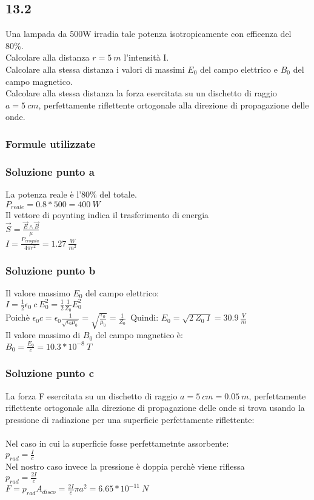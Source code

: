 \documentclass[../../main.tex]{subfiles}
\begin{document}
\subsection*{13.2}
Una lampada da 500W irradia tale potenza isotropicamente con efficenza del 80\%.\\
Calcolare alla distanza $r=5\ m$ l'intensità I.\\
Calcolare alla stessa distanza i valori di massimi $E_0$ del campo elettrico e $B_0$ del campo magnetico.\\
Calcolare alla stessa distanza la forza esercitata su un dischetto di raggio $a=5\ cm$, perfettamente riflettente ortogonale alla direzione di propagazione delle onde.
\subsubsection*{Formule utilizzate}
\subsubsection*{Soluzione punto a}
La potenza reale è l'80\% del totale.\\
$P_{reale} = 0.8 * 500 = 400\ W$\\
Il vettore di poynting indica il trasferimento di energia\\
$\vec{S} = \frac{\vec{E}\wedge\vec{B}}{\mu}$\\
$I = \frac{P_{erogata}}{4\pi r^2} = 1.27\ \frac{W}{m^2}$\\
\subsubsection*{Soluzione punto b}
Il valore massimo $E_0$ del campo elettrico:\\
$I = \frac{1}{2}\epsilon_0\ c\ E_0^2 = \frac{1}{2}\frac{1}{Z_0}E_0^2$\\
Poichè $\epsilon_0 c = \epsilon_0\frac{1}{\sqrt{\epsilon_0\mu_0}} = \sqrt{\frac{\epsilon_0}{\mu_0}} = \frac{1}{Z_0}$\
Quindi: $E_0 = \sqrt{2\ Z_0\ I} = 30.9\ \frac{V}{m}$\\
Il valore massimo di $B_0$ del campo magnetico è:\\
$B_0 = \frac{E_0}{c} = 10.3 * 10^{-8}\ T$
\subsubsection*{Soluzione punto c}
La forza F esercitata su un dischetto di raggio $a = 5\ cm = 0.05\ m$, perfettamente riflettente ortogonale alla direzione di propagazione delle onde si trova usando la pressione di radiazione per una superficie perfettamente riflettente:\\\\
Nel caso in cui la superficie fosse perfettametnte assorbente:\\
$p_{rad} = \frac{I}{c}$\\
Nel nostro caso invece la pressione è doppia perchè viene riflessa\\
$p_{rad} = \frac{2I}{c}$\\
$F = p_{rad} A_{disco} = \frac{2I}{c} \pi a^2 = 6.65 * 10^{-11}\ N$\\
\newpage
\end{document}
